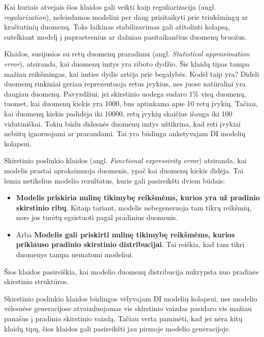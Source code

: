 \documentclass{VUMIFInfKursinis}
\begin{document}
Kai kuriais atvejais šios klaidos gali veikti kaip reguliarizacija (angl. \textsl{regularization}), neleisdamos modeliui per daug prisitaikyti prie triukšmingų ar kraštutinių duomenų. Toks laikinas stabilizavimas gali atitolinti kolapsą, sutelkiant modelį į paprastesnius ar dažniau pasitaikančius duomenų bruožus.


Klaidos, susijusios su retų duomenų praradimu (angl. \textsl{Statistical approximation error}), atsiranda, kai duomenų imtys yra riboto dydžio. Šis klaidų tipas tampa mažiau reikšmingas, kai imties dydis artėja prie begalybės. Kodėl taip yra? Dideli duomenų rinkiniai geriau reprezentuoja retus įvykius, nes juose natūraliai yra daugiau duomenų. Pavyzdžiui, jei skirstinio uodega sudaro 1\% visų duomenų, tuomet, kai duomenų kiekis yra 1000, bus aptinkama apie 10 retų įvykių. Tačiau, kai duomenų kiekis padidėja iki 10000, retų įvykių skaičius išauga iki 100 vidutiniškai. Tokiu būdu didesnės duomenų imtys užtikrina, kad reti įvykiai nebūtų ignoruojami ar prarandami. Tai yra būdinga ankstyvajam DI modelių kolapsui.


Skirstinio poslinkio klaidos (angl. \textsl{Functional expressivity error}) atsiranda, kai modelis prastai aproksimuoja duomenis, ypač kai duomenų kiekis didėja. Tai lemia netikslius modelio rezultatus, kurie gali pasireikšti dviem būdais:
\begin{itemize}
\item \textbf{Modelis priskiria nulinę tikimybę reikšmėms, kurios yra už pradinio skirstinio ribų}. Kitaip tariant, modelis nebegeneruoja tam tikrų reikšmių, nors jos turėtų egzistuoti pagal pradinius duomenis. 

\item Arba \textbf{Modelis gali priskirti nulinę tikimybę reikšmėms, kurios priklauso pradinio skirstinio distribucijai}. Tai reiškia, kad tam tikri duomenys tampa nematomi modeliui.
\end{itemize}
Šios klaidos pasireiškia, kai modelio duomenų distribucija nukrypsta nuo pradinės skirstinio struktūros.

Skirstinio poslinkio klaidos būdingos vėlyvajam DI modelių kolapsui, nes modelio vėlesnėse generacijose atvaizduojamas vis skirstinio vaizdas pasidaro vis mažiau panašus į pradinio skirstinio vaizdą. Tačiau verta paminėti, kad jei nėra kitų klaidų tipų, šios klaidos gali pasireikšti jau pirmoje modelio generacijoje.
\end{document}
